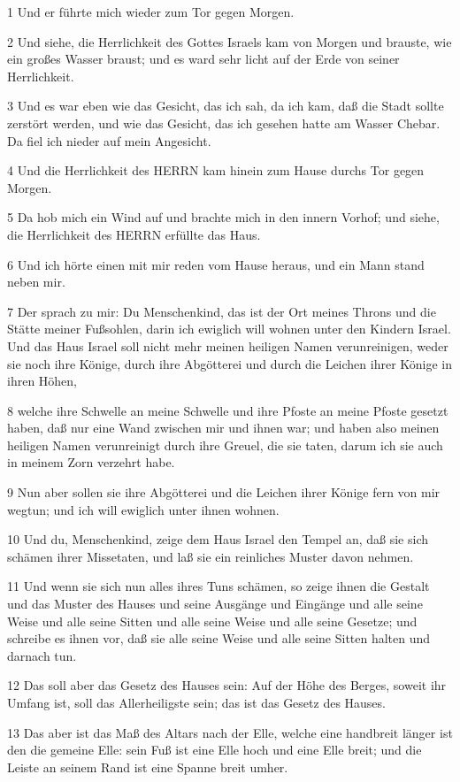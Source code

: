 \par 1 Und er führte mich wieder zum Tor gegen Morgen.
\par 2 Und siehe, die Herrlichkeit des Gottes Israels kam von Morgen und brauste, wie ein großes Wasser braust; und es ward sehr licht auf der Erde von seiner Herrlichkeit.
\par 3 Und es war eben wie das Gesicht, das ich sah, da ich kam, daß die Stadt sollte zerstört werden, und wie das Gesicht, das ich gesehen hatte am Wasser Chebar. Da fiel ich nieder auf mein Angesicht.
\par 4 Und die Herrlichkeit des HERRN kam hinein zum Hause durchs Tor gegen Morgen.
\par 5 Da hob mich ein Wind auf und brachte mich in den innern Vorhof; und siehe, die Herrlichkeit des HERRN erfüllte das Haus.
\par 6 Und ich hörte einen mit mir reden vom Hause heraus, und ein Mann stand neben mir.
\par 7 Der sprach zu mir: Du Menschenkind, das ist der Ort meines Throns und die Stätte meiner Fußsohlen, darin ich ewiglich will wohnen unter den Kindern Israel. Und das Haus Israel soll nicht mehr meinen heiligen Namen verunreinigen, weder sie noch ihre Könige, durch ihre Abgötterei und durch die Leichen ihrer Könige in ihren Höhen,
\par 8 welche ihre Schwelle an meine Schwelle und ihre Pfoste an meine Pfoste gesetzt haben, daß nur eine Wand zwischen mir und ihnen war; und haben also meinen heiligen Namen verunreinigt durch ihre Greuel, die sie taten, darum ich sie auch in meinem Zorn verzehrt habe.
\par 9 Nun aber sollen sie ihre Abgötterei und die Leichen ihrer Könige fern von mir wegtun; und ich will ewiglich unter ihnen wohnen.
\par 10 Und du, Menschenkind, zeige dem Haus Israel den Tempel an, daß sie sich schämen ihrer Missetaten, und laß sie ein reinliches Muster davon nehmen.
\par 11 Und wenn sie sich nun alles ihres Tuns schämen, so zeige ihnen die Gestalt und das Muster des Hauses und seine Ausgänge und Eingänge und alle seine Weise und alle seine Sitten und alle seine Weise und alle seine Gesetze; und schreibe es ihnen vor, daß sie alle seine Weise und alle seine Sitten halten und darnach tun.
\par 12 Das soll aber das Gesetz des Hauses sein: Auf der Höhe des Berges, soweit ihr Umfang ist, soll das Allerheiligste sein; das ist das Gesetz des Hauses.
\par 13 Das aber ist das Maß des Altars nach der Elle, welche eine handbreit länger ist den die gemeine Elle: sein Fuß ist eine Elle hoch und eine Elle breit; und die Leiste an seinem Rand ist eine Spanne breit umher.
